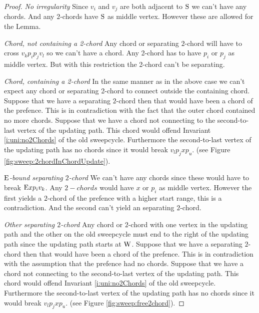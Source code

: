     \begin{proof}
      \emph{No irregularity}
      Since $v_i$ and $v_j$ are both adjacent to $\mathrm{S}$ we can't have any chords. And any $2$-chords have $\mathrm{S}$ as middle vertex. However these are allowed for the Lemma.

      \emph{Chord, not containing a 2-chord}
      Any chord or separating $2$-chord will have to cross $v_k p_i p_j v_l$ so we can't have a chord. Any 2-chord has to have $p_i$ or $p_j$ as middle vertex. But with this restriction the 2-chord can't be separating.

      \emph{Chord, containing a 2-chord}
      In the same manner as in the above case we can't expect any chord or separating 2-chord to connect outside the containing chord.
      Suppose that we have a separating $2$-chord then that would have been a chord of the prefence. This is in contradiction with the fact that the outer chord contained no more chords.
      Suppose that we have a chord not connecting to the second-to-last vertex of the updating path. This chord would offend Invariant \ref{i:uni:no2Chords} of the old sweepcycle. Furthermore the second-to-last vertex of the updating path has no chords since it would break $v_l p_j x p_u$. (see Figure \ref{fig:sweep:2chordInChordUpdate}).

      \emph{$\mathrm{E}$-bound separating $2$-chord}
      We can't have any chords since these would have to break $\mathrm{E} x p_i v_k$. Any $2-chords$ would have $x$ or $p_i$ as middle vertex. However the first yields a $2$-chord of the prefence with a higher start range, this is a contradiction. And the second can't yield an separating $2$-chord.


      \emph{Other separating $2$-chord}
      Any chord or $2$-chord with one vertex in the updating path and the other on the old sweepcycle must end to the right of the updating path since the updating path starts at $\mathrm{W}$.
      Suppose that we have a separating $2$-chord then that would have been a chord of the prefence. This is in contradiction with the assumption that the prefence had no chords.
      Suppose that we have a chord not connecting to the second-to-last vertex of the updating path. This chord would offend Invariant \ref{i:uni:no2Chords} of the old sweepcycle. Furthermore the second-to-last vertex of the updating path has no chords since it would break $v_l p_j x p_u$. (see Figure \ref{fig:sweep:free2chord}).
    \end{proof}

